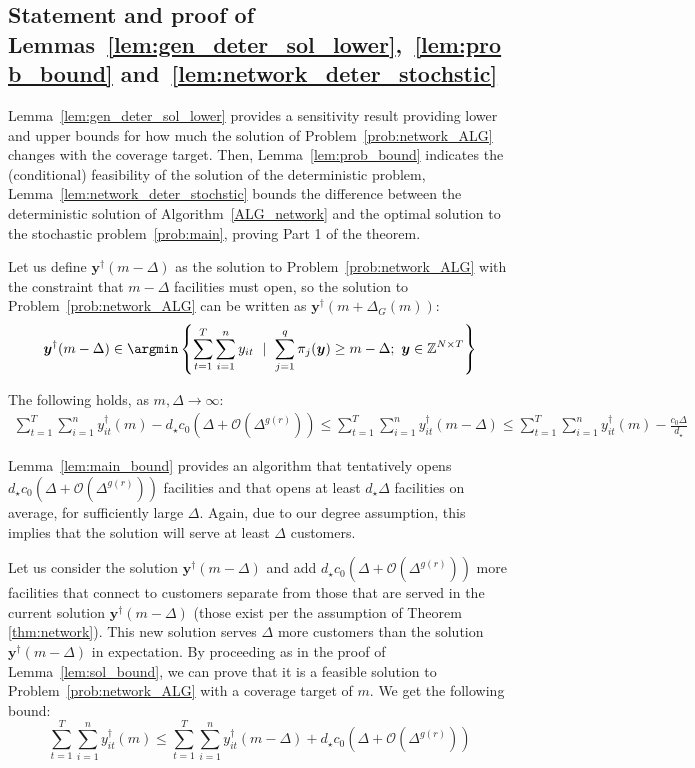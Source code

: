 \documentclass[nonblindrev]{informs3noheader}
\newcommand{\Z}{\mathcal{Z}}
\def\Z{\mathbb{Z}}
\def\calO{\mathcal{O}}
\def\by{\boldsymbol{y}}
\begin{document}
\subsection{Statement and proof of Lemmas~\ref{lem:gen_deter_sol_lower},~\ref{lem:prob_bound} and~\ref{lem:network_deter_stochstic}}

Lemma~\ref{lem:gen_deter_sol_lower} provides a sensitivity result providing lower and upper bounds for how much the solution of Problem~\eqref{prob:network_ALG} changes with the coverage target. Then, Lemma~\ref{lem:prob_bound} indicates the (conditional) feasibility of the solution of the deterministic problem, Lemma~\ref{lem:network_deter_stochstic} bounds the difference between the deterministic solution of Algorithm~\ref{ALG_network} and the optimal solution to the stochastic problem~\eqref{prob:main}, proving Part 1 of the theorem.

Let us define $\by^\dagger(m-\Delta)$ as the solution to Problem~\eqref{prob:network_ALG} with the constraint that $m-\Delta$ facilities must open, so the solution to Problem~\eqref{prob:network_ALG} can be written as $\by^\dagger\left(m+\Delta_G(m)\right)$:
\begin{align*}
    \by^\dagger(m-\Delta)\in\argmin\left\{\sum_{t=1}^T \sum_{i=1}^n y_{it}\ \mid\ \sum_{j=1}^q \pi_{j}(\by) \geq m-\Delta;\ \by \in \Z^{N \times T}\right\}
\end{align*}

\begin{lemma}\label{lem:gen_deter_sol_lower}
   The following holds, as $m,\Delta\to \infty$:
   \begin{align*}
       \sum_{t=1}^T \sum_{i=1}^n y_{it}^\dagger(m)-d_\star c_0\left(\Delta+\calO\left(\Delta^{g(r)}\right)\right)\leq\sum_{t=1}^T \sum_{i=1}^n y_{it}^\dagger(m-\Delta)\leq \sum_{t=1}^T \sum_{i=1}^n y_{it}^\dagger(m)-\frac{c_0\Delta}{d_\star}
   \end{align*}
\end{lemma}
Lemma~\ref{lem:main_bound} provides an algorithm that tentatively opens $d_\star c_0 \left(\Delta+\calO\left(\Delta^{g(r)}\right)\right)$ facilities and that opens at least $d_\star\Delta$ facilities on average, for sufficiently large $\Delta$. Again, due to our degree assumption, this implies that the solution will serve at least $\Delta$ customers.

Let us consider the solution $\by^\dagger(m-\Delta)$ and add $d_\star c_0\left(\Delta+\calO\left(\Delta^{g(r)}\right)\right)$ more facilities that connect to customers separate from those that are served in the current solution $\by^\dagger(m-\Delta)$ (those exist per the assumption of Theorem \ref{thm:network}). This new solution serves $\Delta$ more customers than the solution $\by^\dagger(m-\Delta)$ in expectation. By proceeding as in the proof of Lemma~\ref{lem:sol_bound}, we can prove that it is a feasible solution to Problem~\eqref{prob:network_ALG} with a coverage target of $m$. We get the following bound:
\[\sum_{t=1}^T \sum_{i=1}^n y_{it}^\dagger(m)\leq \sum_{t=1}^T \sum_{i=1}^n y_{it}^\dagger(m-\Delta)+d_\star c_0 \left(\Delta+\calO\left(\Delta^{g(r)}\right)\right)\]
\end{document}
